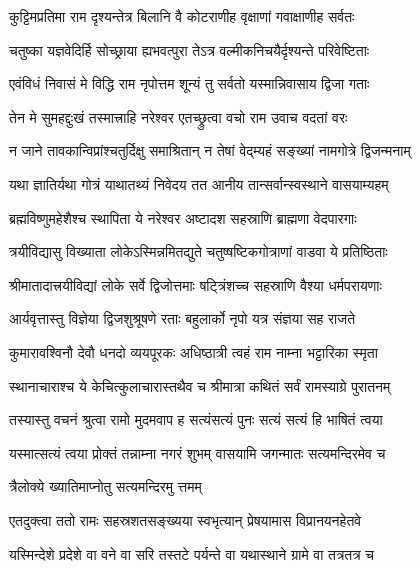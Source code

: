 \twolineshloka
{कुट्टिमप्रतिमा राम दृश्यन्तेत्र बिलानि वै}
{कोटराणीह वृक्षाणां गवाक्षाणीह सर्वतः}%

\twolineshloka
{चतुष्का यज्ञवेदिर्हि सोच्छ्राया ह्यभवत्पुरा}
{तेऽत्र वल्मीकनिचयैर्दृश्यन्ते परिवेष्टिताः}%

\twolineshloka
{एवंविधं निवासं मे विद्धि राम नृपोत्तम}
{शून्यं तु सर्वतो यस्मान्निवासाय द्विजा गताः}%

\twolineshloka
{तेन मे सुमहद्दुःखं तस्मात्त्राहि नरेश्वर}
{एतच्छ्रुत्वा वचो राम उवाच वदतां वरः}%


\twolineshloka
{न जाने तावकान्विप्रांश्चतुर्दिक्षु समाश्रितान्}
{न तेषां वेद्म्यहं सङ्ख्यां नामगोत्रे द्विजन्मनाम्}%

\twolineshloka
{यथा ज्ञातिर्यथा गोत्रं याथातथ्यं निवेदय}
{तत आनीय तान्सर्वान्स्वस्थाने वासयाम्यहम्}%


\twolineshloka
{ब्रह्मविष्णुमहेशैश्च स्थापिता ये नरेश्वर}
{अष्टादश सहस्राणि ब्राह्मणा वेदपारगाः}%

\twolineshloka
{त्रयीविद्यासु विख्याता लोकेऽस्मिन्नमितद्युते}
{चतुष्षष्टिकगोत्राणां वाडवा ये प्रतिष्ठिताः}%

\twolineshloka
{श्रीमातादात्त्रयीविद्यां लोके सर्वे द्विजोत्तमाः}
{षट्त्रिंशच्च सहस्राणि वैश्या धर्मपरायणाः}%

\twolineshloka
{आर्यवृत्तास्तु विज्ञेया द्विजशुश्रूषणे रताः}
{बहुलार्को नृपो यत्र संज्ञया सह राजते}%

\twolineshloka
{कुमारावश्विनौ देवौ धनदो व्ययपूरकः}
{अधिष्ठात्री त्वहं राम नाम्ना भट्टारिका स्मृता}%


\twolineshloka
{स्थानाचाराश्च ये केचित्कुलाचारास्तथैव च}
{श्रीमात्रा कथितं सर्वं रामस्याग्रे पुरातनम्}%

\twolineshloka
{तस्यास्तु वचनं श्रुत्वा रामो मुदमवाप ह}
{सत्यंसत्यं पुनः सत्यं सत्यं हि भाषितं त्वया}%

\twolineshloka
{यस्मात्सत्यं त्वया प्रोक्तं तन्नाम्ना नगरं शुभम्}
{वासयामि जगन्मातः सत्यमन्दिरमेव च}%

\onelineshloka
{त्रैलोक्ये ख्यातिमाप्नोतु सत्यमन्दिरमु त्तमम्}%

\twolineshloka
{एतदुक्त्वा ततो रामः सहस्रशतसङ्ख्यया}
{स्वभृत्यान् प्रेषयामास विप्रानयनहेतवे}%

\twolineshloka
{यस्मिन्देशे प्रदेशे वा वने वा सरि तस्तटे}
{पर्यन्ते वा यथास्थाने ग्रामे वा तत्रतत्र च}%

